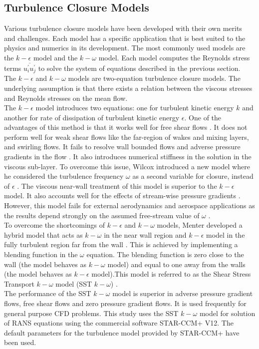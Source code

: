 \subsection{Turbulence Closure Models}
Various turbulence closure models have been developed with their own merits and challenges. Each model has a specific application that is best suited to the physics and numerics in its development. The most commonly used models are the $k-\epsilon$ model and the $k-\omega$ model. Each model computes the Reynolds stress terms $\overline{u_i^\prime u_j^\prime}$ to solve the system of equations described in the previous section.\\
The $k-\epsilon$ and $k-\omega$ models are two-equation turbulence closure models. The underlying assumption is that there exists a relation between the viscous stresses and Reynolds stresses on the mean flow.\\ 
The $k-\epsilon$ model introduces two equations: one for turbulent kinetic energy $k$ and another for rate of dissipation of turbulent kinetic energy $\epsilon$. One of the advantages of this method is that it works well for free shear flows \cite{Reference8}. It does not perform well for weak shear flows like the far-region of wakes and mixing layers, and swirling flows. It fails to resolve wall bounded flows and adverse pressure gradients in the flow \cite{Reference8}. It also introduces numerical stiffness in the solution in the viscous sub-layer. To overcome this issue, Wilcox introduced a new model where he considered the turbulence frequency $\omega$ as a second variable for closure, instead of $\epsilon$ \cite{Reference8}. The viscous near-wall treatment of this model is superior to the $k-\epsilon$ model. It also accounts well for the effects of stream-wise pressure gradients \cite{Reference9}. However, this model fails for external aerodynamics and aerospace applications as the results depend strongly on the assumed free-stream value of $\omega$ \cite{Reference8}.\\
To overcome the  shortcomings of $k-\epsilon$ and $k-\omega$ models, Menter developed a hybrid model that acts as $k-\omega$ in the near wall region and $k-\epsilon$ model in the fully turbulent region far from the wall \cite{Reference8}. This is achieved by implementing a blending function in the $\omega$ equation. The blending function is zero close to the wall (the model behaves as $k-\omega$ model) and equal to one away from the walls  (the model behaves as $k-\epsilon$ model).This model is referred to as the Shear Stress Transport $k-\omega$ model (SST $k-\omega$) \cite{Reference9}.\\
The performance of the SST $k-\omega$ model is superior in adverse pressure gradient flows, free shear flows and zero pressure gradient flows. It is used frequently for general purpose CFD problems. This study uses the SST $k-\omega$ model for solution of RANS equations using the commercial software STAR-CCM+ V12. The default parameters for the turbulence model provided by STAR-CCM+ have been used.
